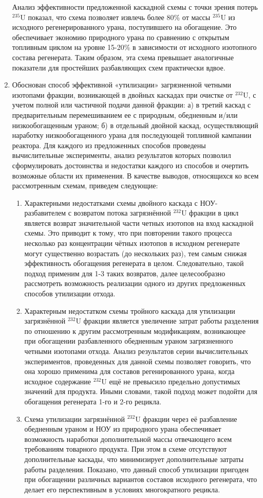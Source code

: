 \begin{enumerate}
Анализ эффективности предложенной каскадной схемы с точки зрения потерь $^{235}$U показал, что схема позволяет извлечь более 80\% от массы $^{235}$U из исходного регенерированного урана, поступившего на обогащение. Это обеспечивает экономию природного урана по сравнению с открытым топливным циклом на уровне 15-20\% в зависимости от исходного изотопного состава регенерата. Таким образом, эта схема превышает аналогичные показатели для простейших разбавляющих схем практически вдвое.
\item Обоснован способ эффективной «утилизации» загрязненной четными изотопами фракции, возникающей в двойных каскадах при очистке от $^{232}$U, с учетом полной или частичной подачи данной фракции: а) в третий каскад с предварительным перемешиванием ее с природным, обедненным и/или низкообогащенным ураном; б) в отдельный двойной каскад, осуществляющий наработку низкообогащенного урана для последующей топливной кампании реактора. Для каждого из предложенных способов проведены вычислительные эксперименты, анализ результатов которых позволил сформулировать достоинства и недостатки каждого из способов и очертить возможные области их применения.
В качестве выводов, относящихся ко всем рассмотренным схемам, приведем следующие:
\begin{enumerate}
\item Характерными недостатками схемы двойного каскада с НОУ-разбавителем с возвратом потока загрязнённой $^{232}$U фракции в цикл является возврат значительной части четных изотопов на вход каскадной схемы. Это приводит к тому, что при повторении такого процесса несколько раз концентрации чётных изотопов в исходном регенерате могут существенно возрастать (до нескольких раз), тем самым снижая эффективность обогащения регенерата в целом. Следовательно, такой подход применим для 1-3 таких возвратов, далее целесообразно рассмотреть возможность реализации одного из других предложенных способов утилизации отхода.
\item Характерным недостатком схемы тройного каскада для утилизации загрязнённой $^{232}$U фракции является увеличение затрат работы разделения по отношению к другим рассмотренным модификациям, возникающее при обогащении разбавленного обедненным ураном загрязненного четными изотопами отхода. Анализ результатов серии вычислительных экспериментов, проведенных для данной схемы позволяет говорить, что она хорошо применима для составов регенированного урана, когда исходное содержание $^{232}$U ещё не превысило предельно допустимых значений для продукта. Иными словами, такой подход может подойти для обогащения регенерата 1-го и 2-го рецикла.
\item Схема утилизации загрязнённой $^{232}$U фракции через её разбавление обедненным ураном и НОУ из природного урана обеспечивает возможность наработки дополнительной массы отвечающего всем требованиям товарного продукта. При этом в схеме отсутствуют дополнительные каскады, что минимизирует дополнительные затраты работы разделения. Показано, что данный способ утилизации пригоден при обогащении различных вариантов составов исходного регенерата, что делает его перспективным в условиях многократного рецикла.
\end{enumerate}


\end{enumerate}
